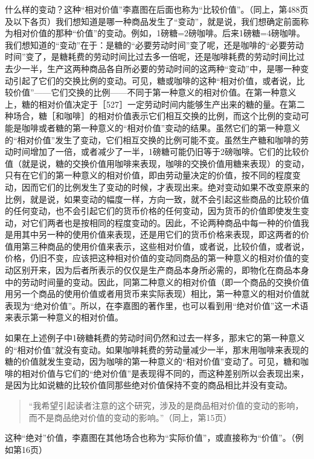什么样的变动？这种“相对价值”李嘉图在后面也称为“比较价值”。（同上，第488页及以下各页）我们想知道是哪一种商品发生了“变动”，就是说，我们想确定前面称为相对价值的那种“价值”的变动。例如，1磅糖=2磅咖啡。后来1磅糖=4磅咖啡。我们想知道的“变动”在于：是糖的“必要劳动时间”变了呢，还是咖啡的“必要劳动时间”变了，是糖耗费的劳动时间比过去多一倍呢，还是咖啡耗费的劳动时间比过去少一半，生产这两种商品各自所必要的劳动时间的这两种“变动”中，是哪一种变动引起了它们的交换比例的变动。可见，糖或咖啡的这种“相对价值，或者说，比较价值”——它们交换的比例——不同于第一种意义的相对价值。在第一种意义上，糖的相对价值决定于［527］一定劳动时间内能够生产出来的糖的量。在第二种场合，糖［和咖啡］的相对价值表示它们相互交换的比例，而这个比例的变动可能是咖啡或者糖的第一种意义的“相对价值”变动的结果。虽然它们的第一种意义的“相对价值”发生了变动，它们相互交换的比例可能不变。虽然生产糖和咖啡的劳动时间增加了一倍，或者减少了一半，1磅糖可能仍旧等于2磅咖啡。它们的比较价值（就是说，糖的交换价值用咖啡来表现，咖啡的交换价值用糖来表现）的变动，只有在它们的第一种意义的相对价值，即由劳动量决定的价值，按不同的程度变动，因而它们的比例发生了变动的时候，才表现出来。绝对变动如果不改变原来的比例，就是说，如果变动的幅度一样，方向一致，就不会引起这些商品的比较价值的任何变动，也不会引起它们的货币价格的任何变动，因为货币的价值即使发生变动，对它们两者也是按相同的程度变动的。因此，不论两种商品中每一种的价值我是用其中另一种的使用价值来表现，还是用它们的货币价格来表现，即这两者的价值用第三种商品的使用价值来表示，这些相对价值，或者说，比较价值，或者说，价格，仍旧不变，应该把这种相对价值的变动同商品的第一种意义的相对价值的变动区别开来，因为后者所表示的仅仅是生产商品本身所必需的，即物化在商品本身中的劳动时间量的变动。因此，同第二种意义的相对价值（即一个商品的交换价值用另一个商品的使用价值或者用货币来实际表现）相比，第一种意义的相对价值就表现为“绝对价值”。所以，在李嘉图的著作里，也可以看到用“绝对价值”这一术语来表示第一种意义的相对价值。

如果在上述例子中1磅糖耗费的劳动时间仍然和过去一样多，那末它的第一种意义的“相对价值”就没有变动。如果咖啡耗费的劳动量减少一半，那末用咖啡来表现的糖的价值就发生变动，因为咖啡的第一种意义的“相对价值”变动了。可见，糖和咖啡的相对价值与它们的“绝对价值”是表现得不同的，而这种差别所以会表现出来，是因为比如说糖的比较价值同那些绝对价值保持不变的商品相比并没有变动。

\begin{quote}{“我希望引起读者注意的这个研究，涉及的是商品相对价值的变动的影响，而不是商品绝对价值的变动的影响。”（同上，第15页）}\end{quote}

这种“绝对”价值，李嘉图在其他场合也称为“实际价值”，或直接称为“价值”。（例如第16页）

